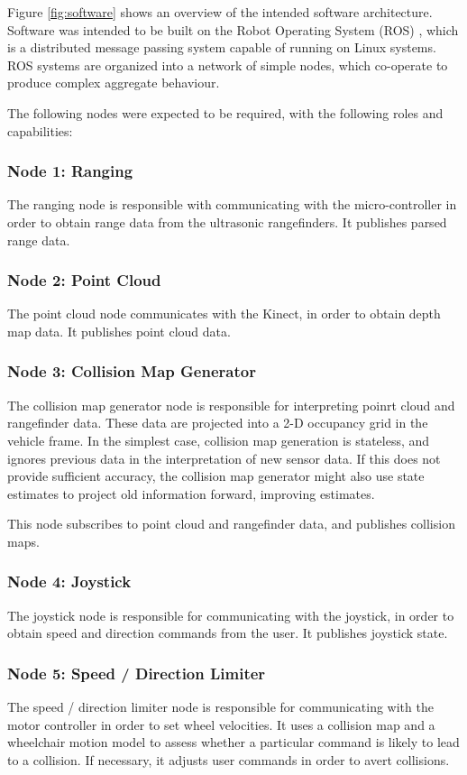 \documentclass[oneside,final,a4paper]{report}
\begin{document}
Figure \ref{fig:software} shows an overview of the intended software architecture.  Software was intended to be built on the Robot Operating System (ROS) \cite{ROS}, which is a distributed message passing system capable of running on Linux systems.  ROS systems are organized into a network of simple nodes, which co-operate to produce complex aggregate behaviour. 

The following nodes were expected to be required, with the following roles and capabilities:

\subsubsection{Node 1: Ranging}
The ranging node is responsible with communicating with the micro-controller in order to obtain range data from the ultrasonic rangefinders.  It publishes parsed range data.

\subsubsection{Node 2: Point Cloud}
The point cloud node communicates with the Kinect, in order to obtain depth map data.  It publishes point cloud data.

\subsubsection{Node 3: Collision Map Generator}
The collision map generator node is responsible for interpreting poinrt cloud and rangefinder data.  These data are projected into a 2-D occupancy grid in the vehicle frame.  In the simplest case, collision map generation is stateless, and ignores previous data in the interpretation of new sensor data.  If this does not provide sufficient accuracy, the collision map generator might also use state estimates to project old information forward, improving estimates.  

This node subscribes to point cloud and rangefinder data, and publishes collision maps.

\subsubsection{Node 4: Joystick}
The joystick node is responsible for communicating with the joystick, in order to obtain speed and direction commands from the user.  It publishes joystick state.

\subsubsection{Node 5: Speed / Direction Limiter}
The speed / direction limiter node is responsible for communicating with the motor controller in order to set wheel velocities.  It uses a collision map and a wheelchair motion model to assess whether a particular command is likely to lead to a collision.  If necessary, it adjusts user commands in order to avert collisions.
\end{document}
